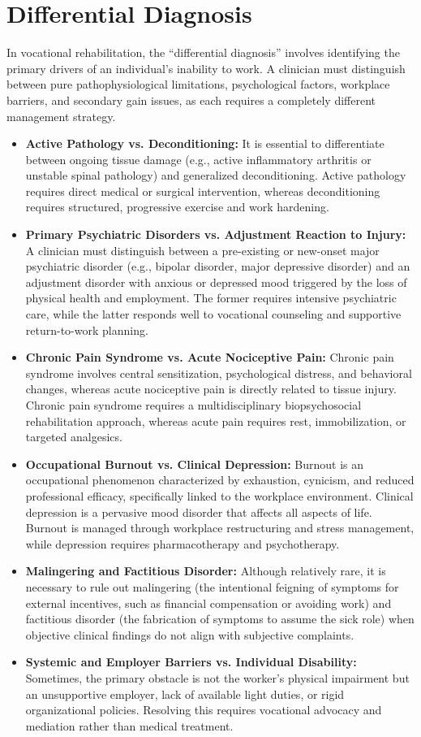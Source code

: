 \section*{Differential Diagnosis}
In vocational rehabilitation, the ``differential diagnosis'' involves identifying the primary drivers of an individual's inability to work. A clinician must distinguish between pure pathophysiological limitations, psychological factors, workplace barriers, and secondary gain issues, as each requires a completely different management strategy.
\begin{itemize}
    \item \textbf{Active Pathology vs. Deconditioning:} It is essential to differentiate between ongoing tissue damage (e.g., active inflammatory arthritis or unstable spinal pathology) and generalized deconditioning. Active pathology requires direct medical or surgical intervention, whereas deconditioning requires structured, progressive exercise and work hardening.
    \item \textbf{Primary Psychiatric Disorders vs. Adjustment Reaction to Injury:} A clinician must distinguish between a pre-existing or new-onset major psychiatric disorder (e.g., bipolar disorder, major depressive disorder) and an adjustment disorder with anxious or depressed mood triggered by the loss of physical health and employment. The former requires intensive psychiatric care, while the latter responds well to vocational counseling and supportive return-to-work planning.
    \item \textbf{Chronic Pain Syndrome vs. Acute Nociceptive Pain:} Chronic pain syndrome involves central sensitization, psychological distress, and behavioral changes, whereas acute nociceptive pain is directly related to tissue injury. Chronic pain syndrome requires a multidisciplinary biopsychosocial rehabilitation approach, whereas acute pain requires rest, immobilization, or targeted analgesics.
    \item \textbf{Occupational Burnout vs. Clinical Depression:} Burnout is an occupational phenomenon characterized by exhaustion, cynicism, and reduced professional efficacy, specifically linked to the workplace environment. Clinical depression is a pervasive mood disorder that affects all aspects of life. Burnout is managed through workplace restructuring and stress management, while depression requires pharmacotherapy and psychotherapy.
    \item \textbf{Malingering and Factitious Disorder:} Although relatively rare, it is necessary to rule out malingering (the intentional feigning of symptoms for external incentives, such as financial compensation or avoiding work) and factitious disorder (the fabrication of symptoms to assume the sick role) when objective clinical findings do not align with subjective complaints.
    \item \textbf{Systemic and Employer Barriers vs. Individual Disability:} Sometimes, the primary obstacle is not the worker's physical impairment but an unsupportive employer, lack of available light duties, or rigid organizational policies. Resolving this requires vocational advocacy and mediation rather than medical treatment.
\end{itemize}

